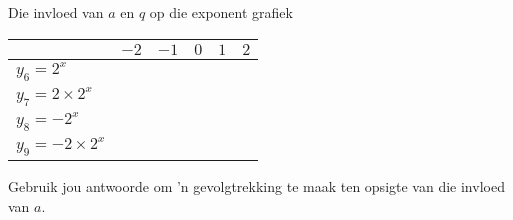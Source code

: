 \begin{Investigation}{Die invloed van $a$ en $q$ op die exponent grafiek}
\begin{table}[H]
\begin{center}
\begin{tabular}{|l|c|c|c|c|c|}
\hline
   &  $-2$ & $-1$ & $0$ & $1$ & $2$ 
\\ \hline
$y_6=2^{x}$& \hspace{1cm} & \hspace{1cm} & \hspace{1cm} & \hspace{1cm} & \hspace{1cm}
\\ \hline
$y_7=2 \times 2^{x}$&  &&&&
\\ \hline
$y_8=-2^{x}$&  &&&&
\\ \hline
$y_9=-2 \times 2^{x}$&  &&&&
\\ \hline

\end{tabular}
\end{center}
\end{table}
Gebruik jou antwoorde om ’n gevolgtrekking te maak ten opsigte van die invloed van $a$.
\end{Investigation}



